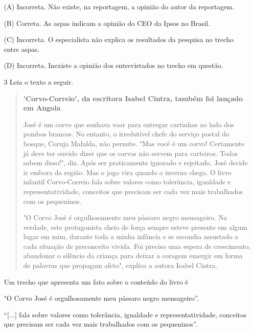 \begin{escolha}
\begin{escolha}
{(A) Incorreta. Não existe, na reportagem, a opinião do autor da
reportagem.

(B) Correta. As aspas indicam a opinião do CEO da Ipsos no Brasil.

(C) Incorreta. O especialista não explica os resultados da pesquisa no
trecho entre aspas.

(D) Incorreta. Inexiste a opinião dos entrevistados no trecho em
questão.

\num{3} Leia o texto a seguir.

\begin{quote}
\textbf{'Corvo-Correio', da escritora Isabel Cintra, também foi lançado em Angola}

José é um corvo que sonhava voar para entregar cartinhas ao lado dos
pombos brancos. No entanto, o irredutível chefe do serviço postal do
bosque, Coruja Mafalda, não permite. "Mas você é um corvo! Certamente já
deve ter ouvido dizer que os corvos não servem para carteiros. Todos
sabem disso!", diz. Após ser praticamente ignorado e rejeitado, José
decide ir embora da região. Mas o jogo vira quando o inverno chega. O
livro infantil Corvo-Correio fala sobre valores como tolerância,
igualdade e representatividade, conceitos que precisam ser cada vez mais
trabalhados com os pequeninos.

"O Corvo José é orgulhosamente meu pássaro negro mensageiro. Na
verdade, este protagonista cheio de força sempre esteve presente em
algum lugar em mim, durante toda a minha infância e se escondia
assustado a cada situação de preconceito vivida. Foi preciso uma espera
de crescimento, abandonar o silêncio da criança para deixar a coragem
emergir em forma de palavras que propagam afeto", explica a autora
Isabel Cintra.

\end{quote}

Um trecho que apresenta um fato sobre o conteúdo do livro é

\begin{escolha}
\item "O Corvo José é orgulhosamente meu pássaro negro mensageiro''.

\item ``{[}...{]} fala sobre
valores como tolerância, igualdade e representatividade, conceitos que
precisam ser cada vez mais trabalhados com os pequeninos''.


\end{escolha}}
\end{escolha}
\end{escolha}

